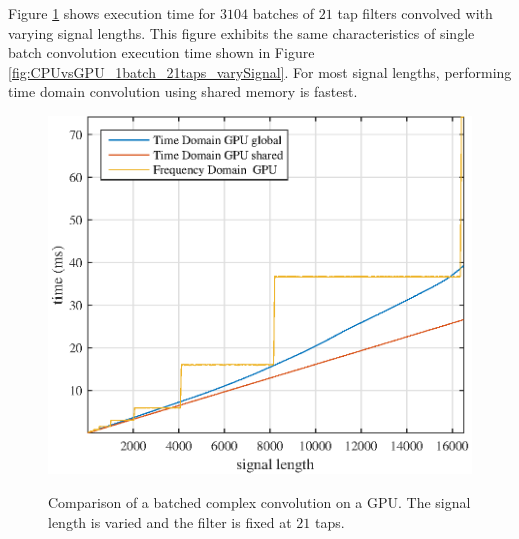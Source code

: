 Figure \ref{fig:CPUvsGPU_3104batch_21taps_varySignal} shows execution time for $3104$ batches of $21$ tap filters convolved with varying signal lengths.
This figure exhibits the same characteristics of single batch convolution execution time shown in Figure \ref{fig:CPUvsGPU_1batch_21taps_varySignal}.
For most signal lengths, performing time domain convolution using shared memory is fastest.
\begin{figure}
	\caption{Comparison of a batched complex convolution on a GPU. The signal length is varied and the filter is fixed at $21$ taps.}
	\centering\includegraphics[width=5in]{figures/gpu_intro/CPUvsGPU_3104batch_21taps_varySignal.eps}
	\label{fig:CPUvsGPU_3104batch_21taps_varySignal}
\end{figure}

